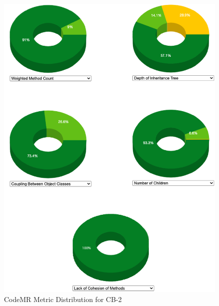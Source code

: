 \begin{figure}[ht!]
    \centering
    \includegraphics[scale=1]{figures/cb-2-donuts.png}
    \caption{CodeMR Metric Distribution for CB-2}
    \label{fig:cb-2-donuts}
\end{figure}
\FloatBarrier


